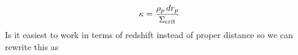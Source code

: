 \begin{equation}
  \kappa = \frac{\rho_p\,dr_p}{\Sigma_{\rm crit}}
 \end{equation}
Is it easiest to work in terms of redshift instead of proper distance so we can rewrite this as